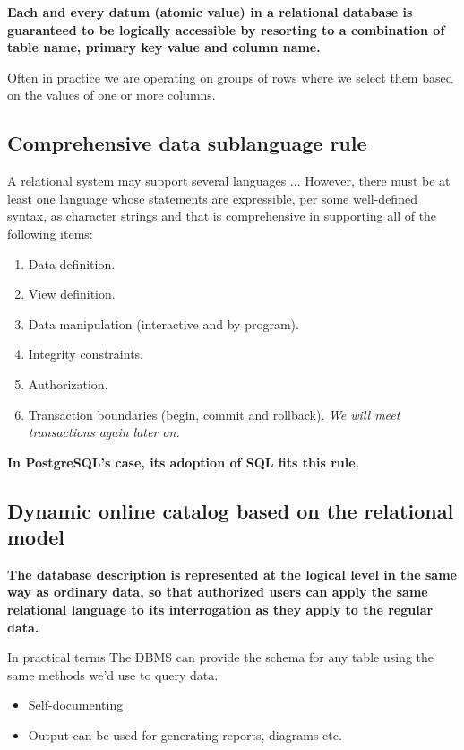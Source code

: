 \documentclass[slides]{pgnotes}
\begin{document}
\textbf{Each and every datum (atomic value) in a relational database is guaranteed to be logically accessible by resorting to a combination of table name, primary key value and column name.}

\begin{description}
\item Often in practice we are operating on groups of rows where we select them based on the values of one or more columns. 
\end{description}
  


\subsection{Comprehensive data sublanguage rule}

A relational system may support several languages ... However, there must be at least one language whose statements are expressible, per some well-defined syntax, as character strings and that is comprehensive in supporting all of the following items:

\begin{enumerate}
\item Data definition.
\item View definition.
\item Data manipulation (interactive and by program).
\item Integrity constraints.
\item Authorization.
\item Transaction boundaries (begin, commit and rollback). \textit{We will meet transactions again later on.}
\end{enumerate}

\textbf{In PostgreSQL's case, its adoption of SQL fits this rule.}


  
\subsection{Dynamic online catalog based on the relational model}

\textbf{The database description is represented at the logical level in the same way as ordinary data, so that authorized users can apply the same relational language to its interrogation as they apply to the regular data.}

\begin{greenbox}{In practical terms}
  The DBMS can provide the schema for any table using the same methods we'd use to query data.
  \begin{itemize}
  \item Self-documenting 
  \item Output can be used for generating reports, diagrams etc.
  \end{itemize}
\end{greenbox}
\end{document}
